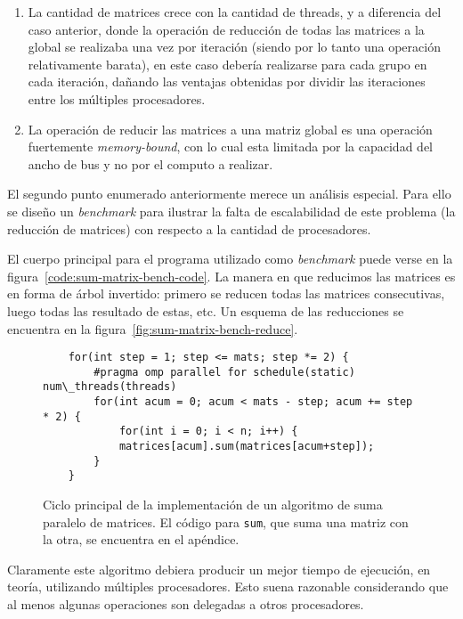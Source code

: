 \begin{enumerate}
    \item La cantidad de matrices crece con la cantidad de threads, y a diferencia
    del caso anterior, donde la operaci\'on de reducci\'on de todas las matrices
    a la global se realizaba una vez por iteraci\'on (siendo por lo tanto
    una operaci\'on relativamente barata), en este caso deber\'ia realizarse para
    cada grupo en cada iteraci\'on, da\~nando las ventajas obtenidas por dividir
    las iteraciones entre los m\'ultiples procesadores.
    \item La operaci\'on de reducir las matrices a una matriz global es una
    operaci\'on fuertemente \textit{memory-bound}, con lo cual esta limitada por
    la capacidad del ancho de bus y no por el computo a realizar.
\end{enumerate}

El segundo punto enumerado anteriormente merece un an\'alisis especial. Para ello
se dise\~no un \textit{benchmark} para ilustrar la falta
de escalabilidad de este problema (la reducci\'on de matrices) con respecto
a la cantidad de procesadores.

El cuerpo principal para el programa utilizado como \textit{benchmark} puede
verse en la figura~\ref{code:sum-matrix-bench-code}. La manera en que reducimos
las matrices es en forma de \'arbol invertido: primero se reducen todas las
matrices consecutivas, luego todas las resultado de estas, etc. Un esquema de
las reducciones se encuentra en la figura~\ref{fig:sum-matrix-bench-reduce}.

\begin{figure}[htbp]
    \label{cod:sum-matrix-bench-code}
    \begin{lstlisting}
    for(int step = 1; step <= mats; step *= 2) {
        #pragma omp parallel for schedule(static) num\_threads(threads)
        for(int acum = 0; acum < mats - step; acum += step * 2) {
            for(int i = 0; i < n; i++) {
            matrices[acum].sum(matrices[acum+step]);
        }
    }
    \end{lstlisting}
    \caption{Ciclo principal de la implementaci\'on de un algoritmo de suma paralelo de matrices.
    El c\'odigo para \texttt{sum}, que suma una matriz con la otra, se encuentra en el ap\'endice.}
\end{figure}
Claramente este algoritmo debiera producir un mejor tiempo de ejecuci\'on, en
teor\'ia, utilizando m\'ultiples procesadores. Esto suena razonable considerando
que al menos algunas operaciones son delegadas a otros procesadores.

